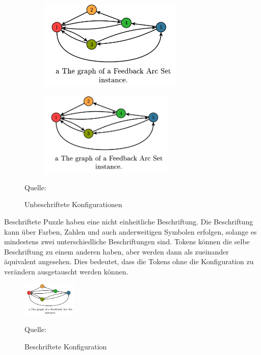\documentclass[seminar,german]{algothesis}
\newcommand*{\quelle}{%
  \footnotesize Quelle:
}
\begin{document}
\begin{figure}[ht]
	\centering
	\begin{subfigure}{.3\textwidth}
		\includegraphics[width=0.75\textwidth]{graph}
    \end{subfigure}%
    \begin{subfigure}{.3\textwidth}
		\includegraphics[width=0.7\textwidth]{graph}
    \end{subfigure}
    \caption{Unbeschriftete Konfigurationen}
	\quelle \cite{akitaya2022pushing}
	\label{fig:6}
\end{figure}


\noindent
Beschriftete Puzzle haben eine nicht einheitliche Beschriftung. Die Beschriftung kann über Farben, Zahlen und auch anderweitigen Symbolen erfolgen, solange es mindestens zwei unterschiedliche Beschriftungen sind. Tokens können die selbe Beschriftung zu einem anderen haben, aber werden dann als zueinander äquivalent angesehen. Dies bedeutet, dass die Tokens ohne die Konfiguration zu verändern ausgetauscht werden können. 
\begin{figure}[ht]
	\centering
	\includegraphics[width=0.23\textwidth]{graph}
	\caption{Beschriftete Konfiguration}
	\quelle \cite{akitaya2022pushing}
	\label{fig:7}
\end{figure}
\end{document}
